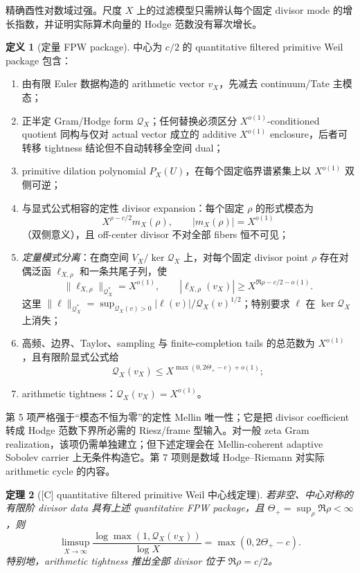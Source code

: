\documentclass[UTF8,11pt,a4paper]{ctexart}
\newtheorem{theorem}{定理}[section]
\theoremstyle{definition}
\newtheorem{definition}[theorem]{定义}
\theoremstyle{remark}
\newcommand{\1}{\mathbf 1}
\newcommand{\cQ}{\mathcal Q}
\newcommand{\statusC}{\textnormal{[C]}}
\begin{document}
精确酉性对数域过强。尺度 $X$ 上的过滤模型只需辨认每个固定 divisor mode 的增长指数，并证明实际算术向量的 Hodge 范数没有幂次增长。

\begin{definition}[定量 FPW package]
中心为 $c/2$ 的 quantitative filtered primitive Weil package 包含：
\begin{enumerate}
  \item 由有限 Euler 数据构造的 arithmetic vector $v_X$，先减去 continuum/Tate 主模态；
  \item 正半定 Gram/Hodge form $\cQ_X$；任何替换必须区分 $X^{o(1)}$-conditioned quotient 同构与仅对 actual vector 成立的 additive $X^{o(1)}$ enclosure，后者可转移 tightness 结论但不自动转移全空间 dual；
  \item primitive dilation polynomial $P_X(U)$，在每个固定临界谱紧集上以 $X^{o(1)}$ 双侧可逆；
  \item 与显式公式相容的定性 divisor expansion：每个固定 $\rho$ 的形式模态为
  \[
    X^{\rho-c/2}m_X(\rho),\qquad |m_X(\rho)|=X^{o(1)}
  \]
  （双侧意义），且 off-center divisor 不对全部 fibers 恒不可见；
  \item \emph{定量模式分离}：在商空间 $V_X/\ker\cQ_X$ 上，对每个固定 divisor point $\rho$ 存在对偶泛函 $\ell_{X,\rho}$ 和一条共尾子列，使
  \[
   \|\ell_{X,\rho}\|_{\cQ_X^*}=X^{o(1)},\qquad
   |\ell_{X,\rho}(v_X)|
      \geq X^{\Re\rho-c/2-o(1)}.
  \]
  这里
  $\|\ell\|_{\cQ_X^*}=\sup_{\cQ_X(v)>0}|\ell(v)|/\cQ_X(v)^{1/2}$；特别要求 $\ell$ 在 $\ker\cQ_X$ 上消失；
  \item 高频、边界、Taylor、sampling 与 finite-completion tails 的总范数为 $X^{o(1)}$，且有限阶显式公式给
  \[
    \cQ_X(v_X)\leq X^{\max(0,2\Theta_+-c)+o(1)};
  \]
  \item arithmetic tightness：$\cQ_X(v_X)=X^{o(1)}$。
\end{enumerate}
第 5 项严格强于“模态不恒为零”的定性 Mellin 唯一性；它是把 divisor coefficient 转成 Hodge 范数下界所必需的 Riesz/frame 型输入。对一般 zeta Gram realization，该项仍需单独建立；但下述定理会在 Mellin-coherent adaptive Sobolev carrier 上无条件构造它。第 7 项则是数域 Hodge--Riemann 对实际 arithmetic cycle 的内容。
\end{definition}

\begin{theorem}[\statusC{} quantitative filtered primitive Weil 中心线定理]\label{thm:fpw}
若非空、中心对称的有限阶 divisor data 具有上述 quantitative FPW package，且
$\Theta_+=\sup_\rho\Re\rho<\infty$，则
\[
  \limsup_{X\to\infty}
  \frac{\log\max(1,\cQ_X(v_X))}{\log X}
  =\max(0,2\Theta_+-c).
\]
特别地，arithmetic tightness 推出全部 divisor 位于 $\Re\rho=c/2$。
\end{theorem}
\end{document}
